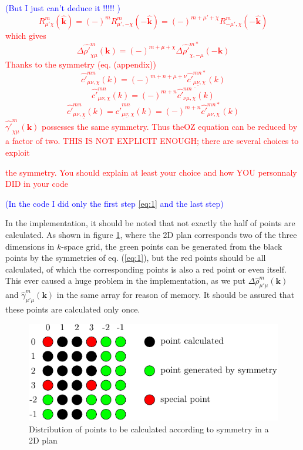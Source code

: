 \textcolor{blue}{(But I just can't deduce it !!!!! )}\textcolor{red}{
\begin{equation}
R_{\mu'\chi}^{m}(\hat{\mathbf{k}})=(-)^{m}R_{\mu',-\chi}^{m}(-\hat{\mathbf{k}})=(-)^{m+\mu'+\chi}R_{-\mu',\chi}^{m}(-\hat{\mathbf{k}})\label{eq:3}
\end{equation}
which gives
\begin{equation}
\Delta\hat{\rho'}_{\chi\mu}^{m}(\mathbf{k})=(-)^{m+\mu+\chi}\Delta\hat{\rho'}_{\chi,-\mu}^{m*}(-\mathbf{k})\label{eq:2}
\end{equation}
Thanks to the symmetry (eq. (appendix)) 
\begin{equation}
\hat{c'}_{\mu\nu,\chi}^{mn}(k)=(-)^{m+n+\mu+\nu}\hat{c'}_{\underline{\mu}\underline{\nu},\chi}^{mn*}(k)
\end{equation}
\begin{equation}
\hat{c'}_{\mu\nu,\chi}^{mn}(k)=(-)^{m+n}\hat{c'}_{\nu\mu,\chi}^{nm}(k)
\end{equation}
\begin{equation}
\hat{c'}_{\mu\nu,\underline{\chi}}^{mn}(k)=\hat{c'}_{\underline{\mu}\underline{\nu},\chi}^{mn}(k)=(-)^{m+n}\hat{c'}_{\mu\nu,\chi}^{mn*}(k)
\end{equation}
$\hat{\gamma'}_{\chi\mu}^{m}(\mathbf{k})$ possesses the same symmetry.
Thus the\acs{OZ} equation can be reduced by a factor of two. THIS
IS NOT EXPLICIT ENOUGH; there are several choices to exploit}

\textcolor{red}{the symmetry. You should explain at least your choice
and how YOU personnaly DID in your code}

\textcolor{blue}{(In the code I did only the first step \ref{eq:1}
and the last step)}

In the implementation, it should be noted that not exactly the half
of points are calculated. As shown in figure \ref{fig:points-symm},
where the 2D plan corresponds two of the three dimensions in $k$-space
grid, the green points can be generated from the black points by the
symmetries of eq. (\ref{eq:1}), but the red points should be all
calculated, of which the corresponding points is also a red point
or even itself. This ever caused a huge problem in the implementation,
as we put $\Delta\hat{\rho}_{\mu'\mu}^{m}(\mathbf{k})$ and $\hat{\gamma}_{\mu'\mu}^{m}(\mathbf{k})$
in the same array for reason of memory. It should be assured that
these points are calculated only once.

\begin{figure}[h]
\begin{centering}
\includegraphics{_figure/test_lmn}
\par\end{centering}
\caption{Distribution of points to be calculated according to symmetry in a
2D plan\label{fig:points-symm}}
\end{figure}

